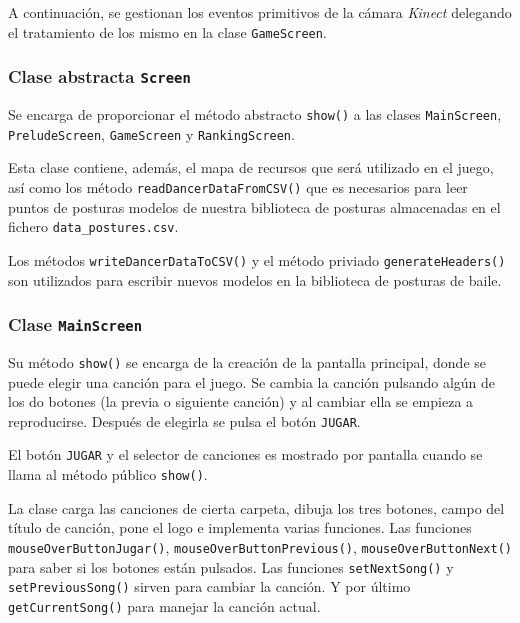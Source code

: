 \documentclass[10pt,a4paper]{report}
\begin{document}
	 	
	 
	 A continuación, se gestionan los eventos primitivos de la cámara \textit{Kinect} delegando el tratamiento de los mismo en la clase \texttt{GameScreen}.
	 
	 	
	 
	 \subsubsection{Clase abstracta \texttt{Screen}}
	 Se encarga de proporcionar el método abstracto \texttt{show()} a las clases \texttt{MainScreen}, \texttt{PreludeScreen}, \texttt{GameScreen} y \texttt{RankingScreen}.
	 
	 Esta clase contiene, además, el mapa de recursos que será utilizado en el juego, así como los método \texttt{readDancerDataFromCSV()} que es necesarios para leer puntos de posturas modelos de nuestra biblioteca de posturas almacenadas en el fichero \texttt{data\_postures.csv}.
	 
	 Los métodos \texttt{writeDancerDataToCSV()} y el método priviado \texttt{generateHeaders()} son utilizados para escribir nuevos modelos en la biblioteca de posturas de baile.
	 
	 
	 
	 \subsubsection{Clase \texttt{MainScreen}}
	 Su método \texttt{show()} se encarga de la creación de la pantalla principal, donde se puede elegir una canción para el juego. Se cambia la canción pulsando algún de los do botones (la previa o siguiente canción) y al cambiar ella se empieza a reproducirse. Después de elegirla se pulsa el botón \texttt{JUGAR}.
	 
	 El botón \texttt{JUGAR} y el selector de canciones es mostrado por pantalla cuando se llama al método público \texttt{show()}.
	 
	 

La clase carga las canciones de cierta carpeta, dibuja los tres botones, campo del título de canción, pone el logo e implementa varias funciones. Las funciones \texttt{mouseOverButtonJugar()}, \texttt{mouseOverButtonPrevious()}, \texttt{mouseOverButtonNext()} para saber si los botones están pulsados. Las funciones \texttt{setNextSong()} y \texttt{setPreviousSong()} sirven para cambiar la canción. Y por último \texttt{getCurrentSong()} para manejar la canción actual.
\end{document}
